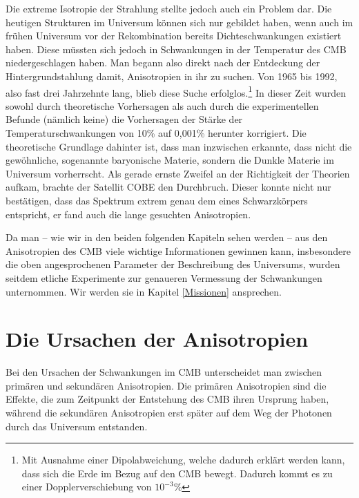 \documentclass[10pt,a4paper]{article}
\begin{document}
Die extreme Isotropie der Strahlung stellte jedoch auch ein Problem dar. Die heutigen Strukturen im Universum können sich nur gebildet haben, wenn auch im frühen Universum vor der Rekombination bereits Dichteschwankungen existiert haben. Diese müssten sich jedoch in Schwankungen in der Temperatur des CMB niedergeschlagen haben. Man begann also direkt nach der Entdeckung der Hintergrundstahlung damit, Anisotropien in ihr zu suchen. Von 1965 bis 1992, also fast drei Jahrzehnte lang, blieb diese Suche erfolglos.\footnote{Mit Ausnahme einer Dipolabweichung, welche dadurch erklärt werden kann, dass sich die Erde im Bezug auf den CMB bewegt. Dadurch kommt es zu einer Dopplerverschiebung von $10^{-3}$\%} %
In dieser Zeit wurden sowohl durch theoretische Vorhersagen als auch durch die experimentellen Befunde (nämlich keine) die Vorhersagen der Stärke der Temperaturschwankungen von 10\% auf 0,001\%  herunter korrigiert.\cite{S+W00}
Die theoretische Grundlage dahinter ist, dass man inzwischen erkannte, dass nicht die gewöhnliche, sogenannte baryonische Materie, sondern die Dunkle Materie im Universum vorherrscht.
Als gerade ernste Zweifel an der Richtigkeit der Theorien aufkam, brachte der Satellit COBE den Durchbruch. Dieser konnte nicht nur bestätigen, dass das Spektrum extrem genau dem eines Schwarzkörpers entspricht, %
er fand auch die lange gesuchten Anisotropien.

Da man -- wie wir in den beiden folgenden Kapiteln sehen werden -- aus den Anisotropien des CMB viele wichtige Informationen gewinnen kann, insbesondere die oben angesprochenen Parameter der Beschreibung des Universums, wurden seitdem etliche Experimente zur genaueren Vermessung der Schwankungen unternommen. Wir werden sie in Kapitel \ref{Missionen} ansprechen.

\section{Die Ursachen der Anisotropien}
Bei den Ursachen der Schwankungen im CMB unterscheidet man zwischen primären und sekundären Anisotropien. Die primären Anisotropien sind die Effekte, die zum Zeitpunkt der Entstehung des CMB ihren Ursprung haben, während die sekundären Anisotropien erst später auf dem Weg der Photonen durch das Universum entstanden.
\end{document}
